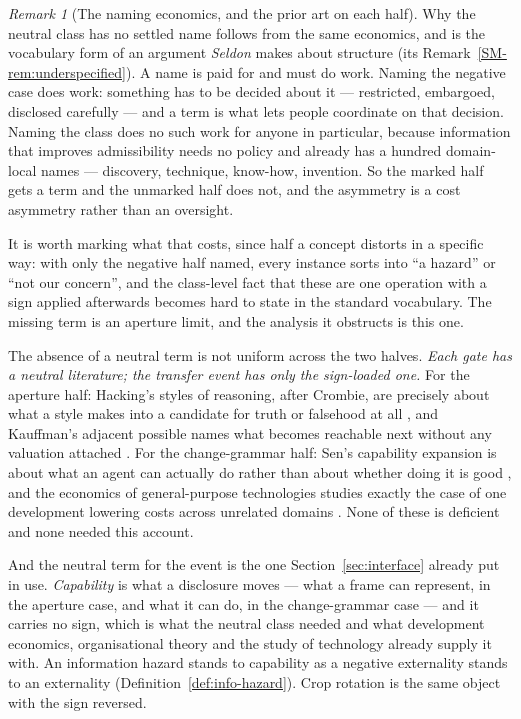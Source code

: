 \documentclass[11pt,a4paper]{article}
\theoremstyle{remark}\newtheorem{remark}[definition]{Remark}
\begin{document}
\begin{remark}[The naming economics, and the prior art on each half]\label{rem:naming-economics}
Why the neutral class has no settled name follows from the same economics, and is the vocabulary form
of an argument \emph{Seldon} makes about structure (its Remark~\ref{SM-rem:underspecified}). A name is paid for and must do work. Naming
the negative case does work: something has to be decided about it --- restricted, embargoed,
disclosed carefully --- and a term is what lets people coordinate on that decision. Naming the class
does no such work for anyone in particular, because information that improves admissibility needs no
policy and already has a hundred domain-local names --- discovery, technique, know-how, invention. So
the marked half gets a term and the unmarked half does not, and the asymmetry is a cost asymmetry rather
than an oversight.

It is worth marking what that costs, since half a concept distorts in a specific way: with only the
negative half named, every instance sorts into ``a hazard'' or ``not our concern'', and the class-level
fact that these are one operation with a sign applied afterwards becomes hard to state in the standard
vocabulary. The missing term is an aperture limit, and the analysis it obstructs is this one.

The absence of a neutral term is not uniform across the two halves. \emph{Each gate has a neutral
literature; the transfer event has only the sign-loaded one.} For the aperture half: Hacking's styles of
reasoning, after Crombie, are precisely about what a style makes into a candidate for truth or falsehood
at all \citep{hacking1992}, and Kauffman's adjacent possible names what becomes reachable next without
any valuation attached \citep{kauffman2000}. For the change-grammar half: Sen's capability expansion is
about what an agent can actually do rather than about whether doing it is good \citep{sen1999}, and the
economics of general-purpose technologies studies exactly the case of one development lowering costs
across unrelated domains \citep{bresnahan1995}. None of these is deficient and none needed this
account.

And the neutral term for the event is the one Section~\ref{sec:interface} already put in use.
\emph{Capability} is what a disclosure moves --- what a frame can represent, in the aperture case, and
what it can do, in the change-grammar case --- and it carries no sign, which is what the neutral class
needed and what development economics, organisational theory and the study of technology already supply
it with. An information hazard stands to capability as a negative externality stands to an externality
(Definition~\ref{def:info-hazard}). Crop
rotation is the same object with the sign reversed.


\end{remark}
\end{document}
